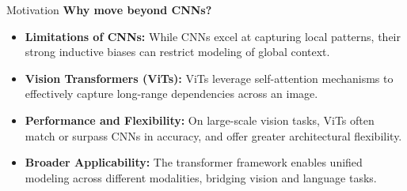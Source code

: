 \begin{frame}{Motivation}
    \textbf{Why move beyond CNNs?}
    \begin{itemize}
        \item \textbf{Limitations of CNNs:} While CNNs excel at capturing local patterns, their strong inductive biases can restrict modeling of global context.
        \item \textbf{Vision Transformers (ViTs):} ViTs leverage self-attention mechanisms to effectively capture long-range dependencies across an image.
        \item \textbf{Performance and Flexibility:} On large-scale vision tasks, ViTs often match or surpass CNNs in accuracy, and offer greater architectural flexibility.
        \item \textbf{Broader Applicability:} The transformer framework enables unified modeling across different modalities, bridging vision and language tasks.
    \end{itemize}
\end{frame}